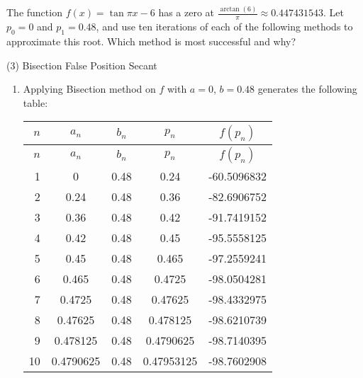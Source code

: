 \documentclass[../../../../Assignments]{subfiles}
\begin{document}
\begin{exercise}
    The function \(f(x) = \tan{\pi x} - 6\) has a zero at
    \(\frac{\arctan(6)}{\pi} \approx \num{0.447431543}\). Let \(p_0 = 0\) and
    \(p_1 = \num{0.48}\), and use ten iterations of each of the following
    methods to approximate this root. Which method is most successful and why?

    \begin{tasks}(3)
        \task Bisection
        \task False Position
        \task Secant
    \end{tasks}
\end{exercise}

\begin{solution}
    \begin{enumerate}[label = \alph*)]
        \item Applying Bisection method on \(f\) with \(a = 0\), \(b =
            \num{0.48}\) generates the following table:

            \begin{longtable}{r S[table-format=1.7] S[table-format=1.2] S[table-format=1.8] S[table-format=-2.7]}
                \toprule
                \(n\)  &   {\(a_n\)}   &   {\(b_n\)}   &   {\(p_n\)}   &  {\(f(p_n)\)}  \\
                \midrule
                \endfirsthead
                \(n\)  &   {\(a_n\)}   &   {\(b_n\)}   &   {\(p_n\)}   &  {\(f(p_n)\)}  \\
                \midrule
                  &  0            &  0.48         &  0.24         &  -60.5096832   \\
                    2  &  0.24         &  0.48         &  0.36         &  -82.6906752   \\
                    3  &  0.36         &  0.48         &  0.42         &  -91.7419152   \\
                    4  &  0.42         &  0.48         &  0.45         &  -95.5558125   \\
                    5  &  0.45         &  0.48         &  0.465        &  -97.2559241   \\
                    6  &  0.465        &  0.48         &  0.4725       &  -98.0504281   \\
                    7  &  0.4725       &  0.48         &  0.47625      &  -98.4332975   \\
                    8  &  0.47625      &  0.48         &  0.478125     &  -98.6210739   \\
                    9  &  0.478125     &  0.48         &  0.4790625    &  -98.7140395   \\
                   10  &  0.4790625    &  0.48         &  0.47953125   &  -98.7602908   \\
                \bottomrule
            \end{longtable}


\end{enumerate}
\end{solution}
\end{document}
